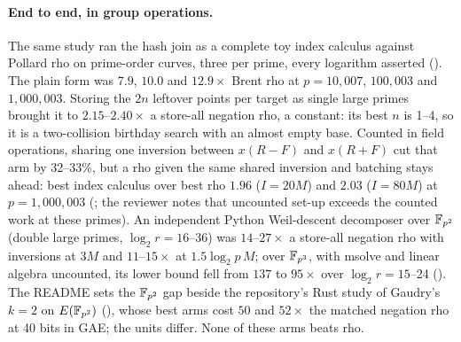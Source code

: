 \paragraph{End to end, in group operations.} The same study ran the hash
join as a complete toy index calculus against Pollard rho on prime-order
curves, three per prime, every logarithm asserted
(). The
plain form was $7.9$, $10.0$ and $12.9\times$ Brent rho at $p=10{,}007$,
$100{,}003$ and $1{,}000{,}003$. Storing the $2n$ leftover points per
target as single large primes brought it to $2.15$--$2.40\times$ a
store-all negation rho, a constant: its best $n$ is 1--4, so it is a
two-collision birthday search with an almost empty base. Counted in field
operations, sharing one inversion between $x(R-F)$ and $x(R+F)$ cut that
arm by 32--33\%, but a rho given the same shared inversion and batching
stays ahead: best index calculus over best rho $1.96$ ($I=20M$) and $2.03$
($I=80M$) at $p=1{,}000{,}003$
(; the
reviewer notes that uncounted set-up exceeds the counted work at these
primes). An independent Python Weil-descent decomposer over $\mathbb{F}_{p^2}$
(double large primes, $\log_2r=16$--36) was $14$--$27\times$ a store-all
negation rho with inversions at $3M$ and $11$--$15\times$ at
$1.5\log_2p\,M$; over $\mathbb{F}_{p^3}$, with msolve and linear algebra
uncounted, its lower bound fell from $137$ to $95\times$ over $\log_2r=15$--24
(). The
README sets the $\mathbb{F}_{p^2}$ gap beside the repository's Rust study of
Gaudry's $k=2$ on $E(\mathbb{F}_{p^2})$
(), whose best arms
cost $50$ and $52\times$ the matched negation rho at 40 bits in GAE; the
units differ. None of these arms beats rho.
